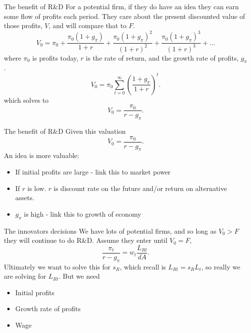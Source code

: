 \begin{frame}{The benefit of R\&D}
For a potential firm, if they do have an idea they can earn some flow of profits each period. They care about the present discounted value of those profits, $V$, and will compare that to $F$.
\begin{equation}
	V_0 = \pi_0 + \frac{\pi_0(1+g_{\pi})}{1+r} + \frac{\pi_0(1+g_{\pi})^2}{(1+r)^2} + \frac{\pi_0(1+g_{\pi})^3}{(1+r)^3}+ ... \nonumber
\end{equation}
where $\pi_0$ is profits today, $r$ is the rate of return, and the growth rate of profits, $g_{\pi}$.
\begin{equation}
	V_0 = \pi_0 \sum_{t=0}^{\infty} \left(\frac{1+g_{\pi}}{1+r}\right)^{t}. \nonumber
\end{equation}
which solves to
\begin{equation}
	V_0 = \frac{\pi_0}{r-g_{\pi}}. \label{EQ_V} 
\end{equation}
\end{frame}

\begin{frame}{The benefit of R\&D}
Given this valuation
\begin{equation}
	V_0 = \frac{\pi_0}{r-g_{\pi}}. \label{EQ_V} 
\end{equation}
An idea is more valuable:
\begin{itemize}
	\item If initial profits are large - link this to market power
	\item If $r$ is low. $r$ is discount rate on the future and/or return on alternative assets.
	\item $g_{\pi}$ is high - link this to growth of economy
\end{itemize}
\end{frame}

\begin{frame}{The innovators decisions}
We have lots of potential firms, and so long as $V_0 > F$ they will continue to do R\&D. Assume they enter until $V_0 = F$,
\begin{equation}
	\frac{\pi_t}{r-g_{\pi}} = w_t \frac{L_{Rt}}{dA}. \nonumber
\end{equation}
Ultimately we want to solve this for $s_R$, which recall is $L_{Rt} = s_R L_t$, so really we are solving for $L_{Rt}$. But we need
\begin{itemize}
	\item Initial profits
	\item Growth rate of profits
	\item Wage
\end{itemize}
\end{frame}

